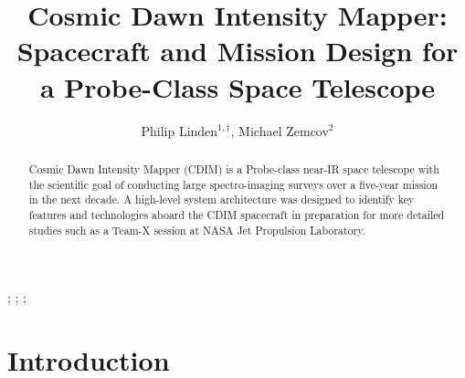 \documentclass{ws-jai}
\begin{document}
\newcommand{\Ltwo}{L$_2$}
\newcommand{\red}[1]{{\color{red} #1}}

\catchline{}{}{}{}{} %


\title{Cosmic Dawn Intensity Mapper: \\Spacecraft and Mission Design for a Probe-Class Space Telescope}

\author{Philip Linden$^{1,\dagger}$, Michael Zemcov$^{2}$}
\address{
$^{1}$Department of Mechanical Engineering, Kate Gleason College of Engineering, Rochester
Institute of Technology, Rochester, NY 14623, USA, pjl7651@rit.edu\\
$^{2}$Center for Detectors, School of Physics and Astronomy, Rochester
Institute of Technology, Rochester, NY 14623, USA, zemcov@cfd.rit.edu
}

\maketitle


\begin{history}
;
;
;
\end{history}

\begin{abstract}
  Cosmic Dawn Intensity Mapper (CDIM) is a Probe-class near-IR space telescope with the scientific goal of conducting large spectro-imaging surveys over a five-year mission in the next decade.
  A high-level system architecture was designed to identify key features and technologies aboard the CDIM spacecraft in preparation for more detailed studies such as a Team-X session at NASA Jet Propulsion Laboratory.
\end{abstract}



\section{Introduction}
\label{sec:introduction}
\end{document}
